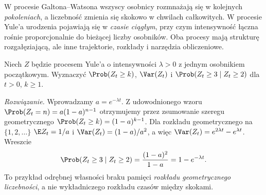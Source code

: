 \begin{uwaga}
W procesie Galtona--Watsona wszyscy osobnicy rozmnażają się
w kolejnych \emph{pokoleniach}, a liczebność zmienia się
skokowo w chwilach całkowitych. W procesie Yule'a
urodzenia pojawiają się w \emph{czasie ciągłym}, przy czym
intensywność łączna rośnie proporcjonalnie do bieżącej liczby
osobników. Oba procesy mają strukturę rozgałęziającą,
ale inne trajektorie, rozkłady i narzędzia obliczeniowe.
\end{uwaga}


\begin{zadanie}
Niech $Z$ będzie procesem Yule'a o intensywności $\lambda>0$
z jednym osobnikiem początkowym. Wyznaczyć
$\Prob(Z_t\ge k)$, $\Var(Z_t)$ i
$\Prob(Z_t\ge3\mid Z_t\ge2)$ dla $t>0$, $k\ge1$.

\emph{Rozwiązanie.} Wprowadzamy $a=e^{-\lambda t}$.
Z udowodnionego wzoru $\Prob(Z_t=n)=a(1-a)^{n-1}$
otrzymujemy przez zsumowanie szeregu geometrycznego
$\Prob(Z_t\ge k)=(1-a)^{k-1}$.
Dla rozkładu geometrycznego na $\{1,2,\dots\}$
$\E Z_t=1/a$ i $\Var(Z_t)=(1-a)/a^2$, a więc
$\Var(Z_t)=e^{2\lambda t}-e^{\lambda t}$.
Wreszcie
\[
\Prob(Z_t\ge3\mid Z_t\ge2)
=\frac{(1-a)^2}{1-a}=1-e^{-\lambda t}.
\]
To przykład odrębnej własności braku pamięci
\emph{rozkładu geometrycznego liczebności},
a nie wykładniczego rozkładu czasów między skokami.
\end{zadanie}

